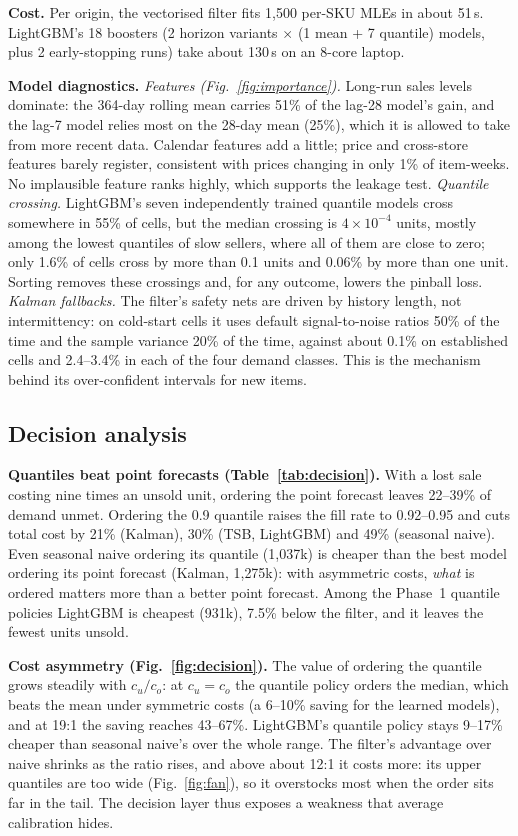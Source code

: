 \documentclass[conference]{IEEEtran}
\begin{document}
\textbf{Cost.} Per origin, the vectorised filter fits 1{,}500 per-SKU MLEs in about 51\,s. LightGBM's 18 boosters (2 horizon variants $\times$ (1 mean + 7 quantile) models, plus 2 early-stopping runs) take about 130\,s on an 8-core laptop.

\textbf{Model diagnostics.} \emph{Features (Fig.~\ref{fig:importance}).} Long-run sales levels dominate: the 364-day rolling mean carries 51\% of the lag-28 model's gain, and the lag-7 model relies most on the 28-day mean (25\%), which it is allowed to take from more recent data. Calendar features add a little; price and cross-store features barely register, consistent with prices changing in only 1\% of item-weeks. No implausible feature ranks highly, which supports the leakage test. \emph{Quantile crossing.} LightGBM's seven independently trained quantile models cross somewhere in 55\% of cells, but the median crossing is $4\times10^{-4}$ units, mostly among the lowest quantiles of slow sellers, where all of them are close to zero; only 1.6\% of cells cross by more than 0.1 units and 0.06\% by more than one unit. Sorting removes these crossings and, for any outcome, lowers the pinball loss. \emph{Kalman fallbacks.} The filter's safety nets are driven by history length, not intermittency: on cold-start cells it uses default signal-to-noise ratios 50\% of the time and the sample variance 20\% of the time, against about 0.1\% on established cells and 2.4--3.4\% in each of the four demand classes. This is the mechanism behind its over-confident intervals for new items.

\subsection{Decision analysis}


\textbf{Quantiles beat point forecasts (Table~\ref{tab:decision}).} With a lost sale costing nine times an unsold unit, ordering the point forecast leaves 22--39\% of demand unmet. Ordering the 0.9 quantile raises the fill rate to 0.92--0.95 and cuts total cost by 21\% (Kalman), 30\% (TSB, LightGBM) and 49\% (seasonal naive). Even seasonal naive ordering its quantile (1{,}037k) is cheaper than the best model ordering its point forecast (Kalman, 1{,}275k): with asymmetric costs, \emph{what} is ordered matters more than a better point forecast. Among the Phase~1 quantile policies LightGBM is cheapest (931k), 7.5\% below the filter, and it leaves the fewest units unsold.

\textbf{Cost asymmetry (Fig.~\ref{fig:decision}).} The value of ordering the quantile grows steadily with $c_u/c_o$: at $c_u=c_o$ the quantile policy orders the median, which beats the mean under symmetric costs (a 6--10\% saving for the learned models), and at 19:1 the saving reaches 43--67\%. LightGBM's quantile policy stays 9--17\% cheaper than seasonal naive's over the whole range. The filter's advantage over naive shrinks as the ratio rises, and above about 12:1 it costs more: its upper quantiles are too wide (Fig.~\ref{fig:fan}), so it overstocks most when the order sits far in the tail. The decision layer thus exposes a weakness that average calibration hides.
\end{document}
